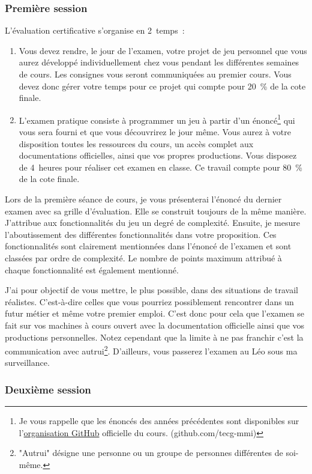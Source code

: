 \subsubsection{Première session}
\label{eval_certificative}
L’évaluation certificative s'organise en 2~temps~:
\begin{enumerate}
    \item Vous devez rendre, le jour de l'examen, votre projet de jeu personnel que vous aurez développé individuellement chez vous pendant les différentes semaines de cours. Les consignes vous seront communiquées au premier cours. Vous devez donc gérer votre temps pour ce projet qui compte pour 20~\% de la cote finale.
    \item L'examen pratique consiste à programmer un jeu à partir d'un énoncé\footnote{Je vous rappelle que les énoncés des années précédentes sont disponibles sur l'\href{https://github.com/tecg-mmi}{organisation GitHub} officielle du cours. (github.com/tecg-mmi)} qui vous sera fourni et que vous découvrirez le jour même. Vous aurez à votre disposition toutes les ressources du cours, un accès complet aux documentations officielles, ainsi que vos propres productions. Vous disposez de 4~heures pour réaliser cet examen en classe. Ce travail compte pour 80~\% de la cote finale.
\end{enumerate}
Lors de la première séance de cours, je vous présenterai l'énoncé du dernier examen avec sa grille d'évaluation. Elle se construit toujours de la même manière. J'attribue aux fonctionnalités du jeu un degré de complexité. Ensuite, je mesure l'aboutissement des différentes fonctionnalités dans votre proposition. Ces fonctionnalités sont clairement mentionnées dans l'énoncé de l'examen et sont classées par ordre de complexité. Le nombre de points maximum attribué à chaque fonctionnalité est également mentionné.

J'ai pour objectif de vous mettre, le plus possible, dans des situations de travail réalistes. C'est-à-dire celles que vous pourriez possiblement rencontrer dans un futur métier et même votre premier emploi. C'est donc pour cela que l'examen se fait sur vos machines à cours ouvert avec la documentation officielle ainsi que vos productions personnelles. Notez cependant que la limite à ne pas franchir c'est la communication avec autrui\footnote{"Autrui" désigne une personne ou un groupe de personnes différentes de soi-même.}. D'ailleurs, vous passerez l'examen au Léo sous ma surveillance.
\subsubsection{Deuxième session}


